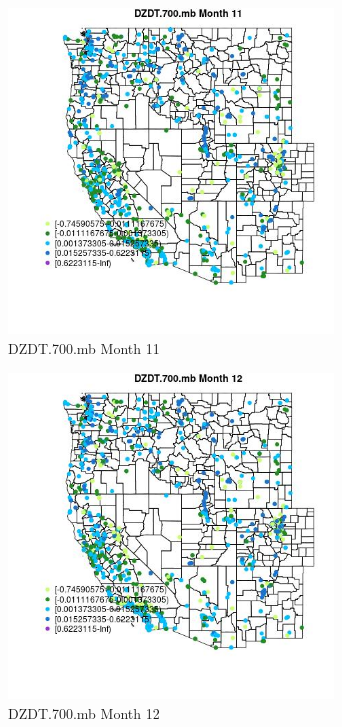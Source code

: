 \begin{figure} 
\centering  
\includegraphics[width=0.77\textwidth]{Code_Outputs/Report_ML_input_PM25_Step4_part_f_de_duplicated_aveswNAs_MapObsMo11DZDT700mb.jpg} 
\caption{\label{fig:Report_ML_input_PM25_Step4_part_f_de_duplicated_aveswNAsMapObsMo11DZDT700mb}DZDT.700.mb Month 11} 
\end{figure} 
 

\begin{figure} 
\centering  
\includegraphics[width=0.77\textwidth]{Code_Outputs/Report_ML_input_PM25_Step4_part_f_de_duplicated_aveswNAs_MapObsMo12DZDT700mb.jpg} 
\caption{\label{fig:Report_ML_input_PM25_Step4_part_f_de_duplicated_aveswNAsMapObsMo12DZDT700mb}DZDT.700.mb Month 12} 
\end{figure} 
 

